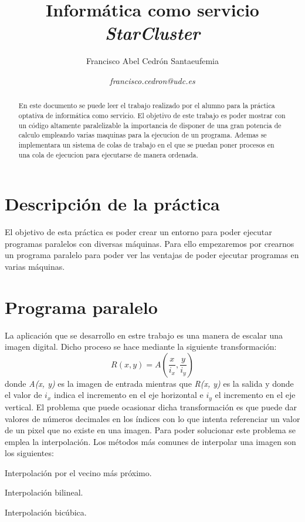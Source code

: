 \documentclass{article}
\title{\textbf{Informática como servicio}
\\ \textbf{\emph{StarCluster}}
}
\author{Francisco Abel Cedrón Santaeufemia \and \textit{francisco.cedron@udc.es}}
\date{} %
\begin{document}
\maketitle %
\renewcommand{\abstractname}{Abstract} %
\begin{abstract}
	En este documento se puede leer el trabajo realizado por el alumno para la práctica optativa de informática como servicio. El objetivo de este trabajo es poder mostrar con un código altamente paralelizable la importancia de disponer de una gran potencia de calculo empleando varias maquinas para la ejecucion de un programa. Ademas se implementara un sistema de colas de trabajo en el que se puedan poner procesos en una cola de ejecucion para ejecutarse de manera ordenada.
\end{abstract}
\renewcommand{\contentsname}{} %
{\setlength{\parskip}{0mm} \tableofcontents} %

\section{Descripción de la práctica}
	El objetivo de esta práctica es poder crear un entorno para poder ejecutar programas paralelos con diversas máquinas. Para ello empezaremos por crearnos un programa paralelo para poder ver las ventajas de poder ejecutar programas en varias máquinas.
	
\section{Programa paralelo}
{\setlength{\parskip}{0mm}
	La aplicación que se desarrollo en estre trabajo es una manera de escalar una imagen digital. Dicho proceso se hace mediante la siguiente transformación:
\begin{equation}
R(x, y) = A \left( \frac{x}{i_x}, \frac{y}{i_y} \right)
\end{equation}
donde \emph{A(x, y)} es la imagen de entrada mientras que \emph{R(x, y)} es la salida y donde el valor de $i_x$ indica el incremento en el eje horizontal 
e $i_y$ el incremento en el eje vertical. El problema que puede ocasionar dicha transformación es que puede dar valores de números decimales en 
los índices con lo que intenta referenciar un valor de un pixel que no existe en una imagen. Para poder solucionar este problema se emplea la interpolación. 
Los métodos más comunes de interpolar una imagen son los siguientes:
\begin{enumerate} {\setlength{\parskip}{0mm}
	\item Interpolación por el vecino más próximo.
	\item Interpolación bilineal.
	\item Interpolación bicúbica.
} \end{enumerate}
}
\end{document}
